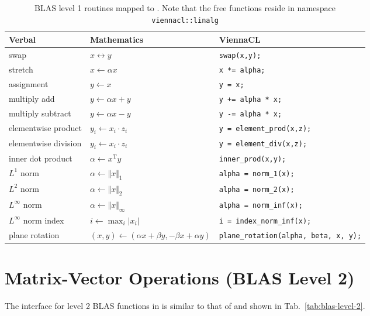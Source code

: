 \begin{table}[tb]
\begin{center}
\begin{tabular}{l|l|p{6cm}}
Verbal & Mathematics & ViennaCL\\
\hline
swap    & $x \leftrightarrow y$ & \lstinline|swap(x,y);| \\
stretch    & $x \leftarrow \alpha x$ & \lstinline|x *= alpha;| \\
assignment & $y \leftarrow x$ & \lstinline|y = x;| \\
multiply add & $y \leftarrow \alpha x + y$ & \lstinline|y += alpha * x;| \\
multiply subtract & $y \leftarrow \alpha x - y$ & \lstinline|y -= alpha * x;| \\
elementwise product & $y_i \leftarrow x_i \cdot z_i$ & \lstinline|y = element_prod(x,z);| \\
elementwise division & $y_i \leftarrow x_i \cdot z_i$ & \lstinline|y = element_div(x,z);| \\
inner dot product & $\alpha \leftarrow x^{\mathrm{T}} y$ & \lstinline|inner_prod(x,y);| \\
$L^1$ norm & $\alpha \leftarrow \Vert x \Vert_1$ & \lstinline|alpha = norm_1(x);| \\
$L^2$ norm & $\alpha \leftarrow \Vert x \Vert_2$ & \lstinline|alpha = norm_2(x);| \\
$L^\infty$ norm & $\alpha \leftarrow \Vert x \Vert_\infty$ & \lstinline|alpha = norm_inf(x);| \\
$L^\infty$ norm index& $i \leftarrow \max_i \vert x_i \vert$ & \lstinline|i = index_norm_inf(x);| \\
plane rotation & $(x,y) \leftarrow (\alpha x + \beta y, -\beta x + \alpha y)$ & \lstinline|plane_rotation(alpha, beta, x, y);| \\
\end{tabular}
\caption{BLAS level 1 routines mapped to {\ViennaCL}. Note that the free functions reside in namespace \texttt{viennacl::linalg}}
\label{tab:blas-level-1}
\end{center}
\end{table}

\section{Matrix-Vector Operations (BLAS Level 2)}
The interface for level 2 BLAS functions in {\ViennaCL} is similar to that of
{\ublas} and shown in Tab.~\ref{tab:blas-level-2}.

